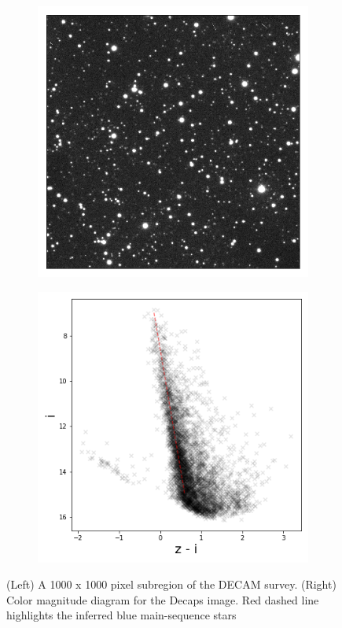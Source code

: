 \begin{figure}[!htb]
    \centering
    \begin{subfigure}[T]{0.45\textwidth}
    \centering
    \includegraphics[width=\textwidth]{./figures/decaps/example_subimage1000_decaps.png}
    \end{subfigure}
    \hfill
    \begin{subfigure}[T]{0.5\textwidth}
    \centering
    \includegraphics[width=\textwidth]{./figures/decaps/decaps_cmd.png}
    \end{subfigure}
    \caption{(Left) A 1000 x 1000 pixel subregion of the DECAM survey. 
    (Right) Color magnitude diagram for the Decaps image. Red dashed line highlights
    the inferred blue main-sequence stars}
    \label{fig:decaps}
\end{figure}

